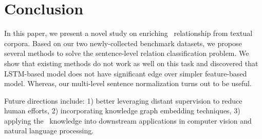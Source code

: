 \section{Conclusion}
In this paper, we present a novel study on enriching \lnear\ relationship from textual corpora. 
Based on our two newly-collected benchmark datasets, we propose several methods to solve the sentence-level relation classification problem. 
We show that existing methods do not work as well on this task and discovered that LSTM-based model does not have significant edge over simpler feature-based model. 
Whereas, our multi-level sentence normalization turns out to be useful.

Future directions include: 1) better leveraging distant supervision to reduce human efforts, 2) incorporating knowledge graph embedding techniques, 3) applying the \lnear\ knowledge into downstream applications in computer vision and natural language processing.
